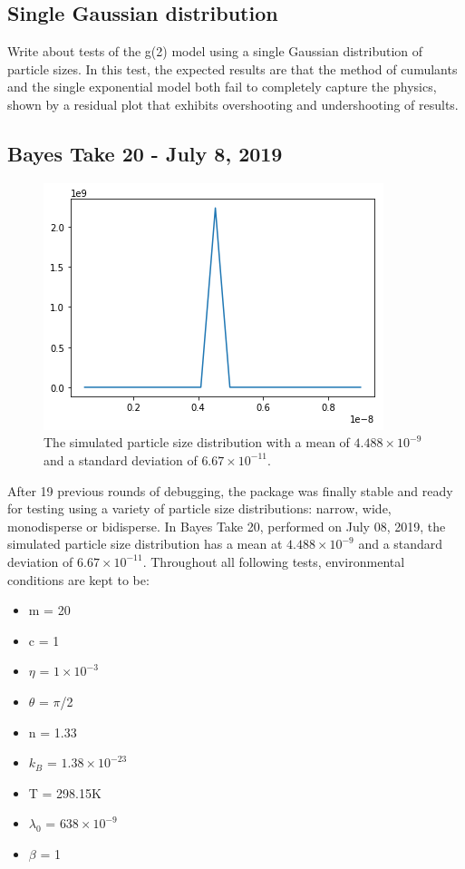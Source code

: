 \documentclass[11pt]{article}
\begin{document}
\subsection{Single Gaussian distribution}
Write about tests of the g(2) model using a single Gaussian distribution of particle sizes. In this test, the expected results are that the method of cumulants and the single exponential model both fail to completely capture the physics, shown by a residual plot that exhibits overshooting and undershooting of results.



\subsection{Bayes Take 20 - July 8, 2019}
\begin{figure}
\centering
\includegraphics[width=0.4\linewidth]{take20.png}
\caption{The simulated particle size distribution with a mean of $4.488\times10^{-9}$ and a standard deviation of $6.67\times10^{-11}$.}
\label{fig:take20simulated}
\end{figure}

After 19 previous rounds of debugging, the package was finally stable and ready for testing using a variety of particle size distributions: narrow, wide, monodisperse or bidisperse. In Bayes Take 20, performed on July 08, 2019, the simulated particle size distribution has a mean at $4.488\times10^{-9}$ and a standard deviation of $6.67\times10^{-11}$. Throughout all following tests, environmental conditions are kept to be:

\begin{itemize}
	\item m = 20
	\item c = 1
	\item $\eta$ = $1\times10^{-3}$
	\item $\theta$ = $\pi$/2
	\item n = 1.33
	\item $k_B$ = $1.38\times10^{-23}$
	\item T = 298.15\si{\kelvin}
	\item $\lambda_0$ = $638\times10^{-9}$
	\item $\beta$ = 1
\end{itemize}
\end{document}
